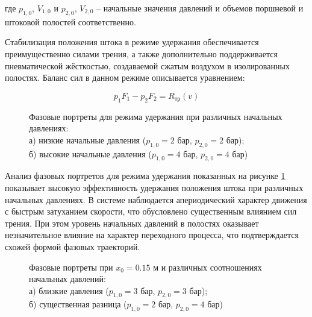 где $p_{1,0}$, $V_{1,0}$ и $p_{2,0}$, $V_{2,0}$ -- начальные значения давлений и объемов поршневой и штоковой полостей соответственно.

Стабилизация положения штока в режиме удержания обеспечивается преимущественно силами трения, а также дополнительно
поддерживается пневматической жёсткостью, создаваемой сжатым воздухом в изолированных полостях. Баланс сил в данном режиме описывается уравнением:

\begin{equation*}
	p_1F_1 - p_2F_2 = R_\text{тр}(v)
\end{equation*}

\begin{figure}[htbp]
	\caption{Фазовые портреты для режима удержания при различных начальных давлениях:\\
		а) низкие начальные давления ($p_{1,0} = 2$ бар, $p_{2,0} = \num{2}$ бар);\\
		б) высокие начальные давления ($p_{1,0} = 4$ бар, $p_{2,0} = \num{4}$ бар)}
	\label{fig:pp_hold_mode}
\end{figure}

Анализ фазовых портретов для режима удержания показанных на рисунке \ref{fig:pp_hold_mode} показывает высокую эффективность удержания положения штока при различных начальных давлениях.
В системе наблюдается апериодический характер движения с быстрым затуханием скорости, что обусловлено существенным влиянием сил трения.
При этом уровень начальных давлений в полостях оказывает незначительное влияние на характер переходного процесса, что подтверждается схожей формой фазовых траекторий.

\begin{figure}[htbp]
	\caption{Фазовые портреты при $x_0 = \num{0.15}$ м и различных соотношениях начальных давлений:\\
		а) близкие давления ($p_{1,0} = 3$ бар, $p_{2,0} = 3$ бар);\\
		б) существенная разница ($p_{1,0} = 2$ бар, $p_{2,0} = 4$ бар)}
	\label{fig:pp_hold_matrix}
\end{figure}

